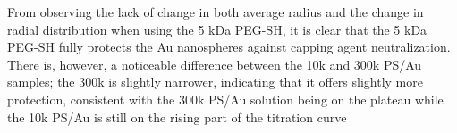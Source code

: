 From observing the lack of change in both average radius and the change in radial distribution when using the 5 kDa PEG-SH, it is clear that the 5 kDa PEG-SH fully protects the Au nanospheres against capping agent neutralization. There is, however, a noticeable difference between the 10k and 300k PS\slash Au samples; the 300k is slightly narrower, indicating that it offers slightly more protection, consistent with the 300k PS\slash Au solution being on the plateau while the 10k PS\slash Au is still on the rising part of the titration curve




